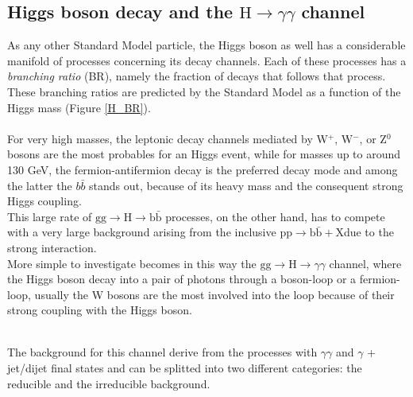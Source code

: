 \subsection{Higgs boson decay and the $\text{H} \rightarrow \gamma \gamma$ channel}
As any other Standard Model particle, the Higgs boson as well has a considerable manifold of processes concerning its decay channels. Each of these processes has a \emph{branching ratio} (BR), namely the fraction of decays that follows that process. These branching ratios are predicted by the Standard Model as a function of the Higgs mass (Figure \ref{H_BR}).
\\ \\
For very high masses, the leptonic decay channels mediated by W$^+$, W$^-$, or Z$^0$ bosons are the most probables for an Higgs event, while for masses up to around 130 GeV, the fermion-antifermion decay is the preferred decay mode and among the latter the $b\bar{b}$ stands out, because of its heavy mass and the consequent strong Higgs coupling.
\\
This large rate of $\text{gg} \rightarrow \text{H} \rightarrow \text{b}\bar{\text{b}}$ processes, on the other hand, has to compete with a very large background arising from the inclusive $\text{pp} \rightarrow \text{b}\bar{\text{b}} + \text{X}$due to the strong interaction.
\\
More simple to investigate becomes in this way the $\text{gg} \rightarrow \text{H} \rightarrow \gamma\gamma$ channel, where the Higgs boson decay into a pair of photons through a boson-loop or a fermion-loop, usually the W bosons are the most involved into the loop because of their strong coupling with the Higgs boson.
\begin{figure*}[h]
\centering
{} \qquad
{}
\end{figure*}
\\The background for this channel derive from the processes with $\gamma\gamma$ and $\gamma$ + jet/dijet final states and can be splitted into two different categories: the reducible and the irreducible background. 
\\
